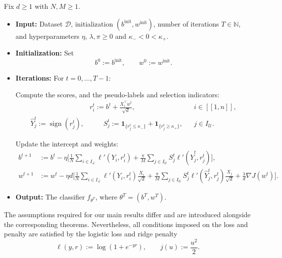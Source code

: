 \begin{algorithm}
\label{alg:self-training}
Fix $d\ge1$ with $N,M\ge1$.
\begin{itemize}[wide]
    \item \textbf{Input:}
    Dataset $\mathcal D$, initialization
    $(b^{\mathrm{init}},w^{\mathrm{init}})$,
    number of iterations $T\in\mathbb N$,
    and hyperparameters
    $\eta$, $\lambda,\pi\ge0$ and $\kappa_-<0<\kappa_+$.

    \item \textbf{Initialization:}
    Set
    \[
        b^0:=b^{\mathrm{init}},
        \qquad
        w^0:=w^{\mathrm{init}}.
    \]

    \item \textbf{Iterations:}
    For $t=0,\ldots,T-1$:

    Compute the scores, and the pseudo-labels and selection indicators:
    \begin{align*}
        &r_i^t
        :=
        b^t+\frac{X_i^\top w^t}{\sqrt d},
         & &i\in[\![1,n]\!], \\
        \widehat Y_j^t :=\operatorname{sign}(r_j^t), &
        \qquad
        S_j^t
        :=
        \mathbf 1_{\{r_j^t\le\kappa_-\}}
        +
        \mathbf 1_{\{r_j^t\ge\kappa_+\}}
        , &&j\in I_{\mathcal U}
        .
    \end{align*}
    
    Update the intercept and weights:
    \begin{align*}
        b^{t+1}
        &:=
        b^t-\eta\Biggl[
            \frac1N\sum_{i\in I_{\mathcal L}}
                \ell'(Y_i,r_i^t)
            +
            \frac{\pi}{M}\sum_{j\in I_{\mathcal U}}
                S_j^t\ell'(\widehat Y_j^t,r_j^t)
        \Biggr],\\
        w^{t+1}
        &:=
        w^t-\eta d\Biggl[
            \frac1N\sum_{i\in I_{\mathcal L}}
                \ell'(Y_i,r_i^t)\frac{X_i}{\sqrt d}
            +
            \frac{\pi}{M}\sum_{j\in I_{\mathcal U}}
                S_j^t\ell'(\widehat Y_j^t,r_j^t)
                \frac{X_j}{\sqrt d}
            +
            \frac{\lambda}{d}\nabla J(w^t)
        \Biggr].
    \end{align*}

    \item \textbf{Output:}
    The classifier $f_{\theta^T}$,
    where $\theta^T=(b^T,w^T)$.
\end{itemize}
\end{algorithm}

The assumptions required for our main results differ and
are introduced alongside the corresponding theorems.
Nevertheless, all conditions imposed on the loss and penalty
are satisfied by the logistic loss and ridge penalty
\begin{equation}
    \ell(y,r):=\log(1+e^{-yr}),
    \qquad
    j(u):=\frac{u^2}{2}.
    \label{eq:logistic-loss-ridge-penalty}
\end{equation}
